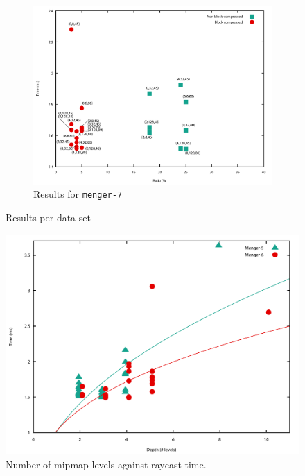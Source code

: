 \clearpage
\begin{figure}
\ContinuedFloat %
\begin{subfigure}{\textwidth}
\centering
    \includegraphics[width=\textwidth]{results/menger-7-ratio.pdf} 
    \caption{Results for \texttt{menger-7}}
    \label{fig:menger-7-ratio}
\end{subfigure}

\caption{Results per data set}
\label{fig:results-time-ratio}
\end{figure}

\begin{figure}[h]
\includegraphics[width=\textwidth]{results/depth-performance.pdf} 
\caption{Number of mipmap levels against raycast time.}
\label{fig:depth-performance}
\end{figure}

